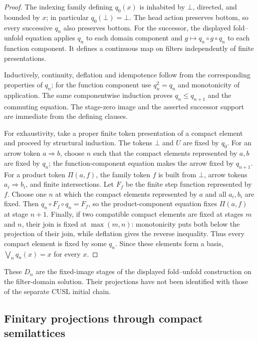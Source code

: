 \documentclass[11pt,a4paper]{article}
\theoremstyle{definition}
\theoremstyle{remark}
\begin{document}
\begin{proof}
The indexing family defining $q_0(x)$ is inhabited by $\bot$,
directed, and bounded by $x$; in particular $q_0(\bot)=\bot$.
The head action preserves bottom, so every successive $q_n$ also
preserves bottom. For the successor, the displayed
fold--unfold equation applies $q_n$ to each domain component and
$g\mapsto q_n\circ g\circ q_n$ to each function component. It defines
a continuous map on filters independently of finite presentations.

Inductively, continuity, deflation and idempotence follow from the
corresponding properties of $q_n$; for the function component use
$q_n^2=q_n$ and monotonicity of application. The same componentwise
induction proves $q_n\leq q_{n+1}$ and the commuting equation. The
stage-zero image and the asserted successor support are immediate from
the defining clauses.

For exhaustivity, take a proper finite token presentation of a compact
element and proceed by structural induction. The tokens $\bot$ and $U$
are fixed by $q_0$. For an arrow token $a\Rightarrow b$, choose $n$
such that the compact elements represented by $a,b$ are fixed by
$q_n$; the function-component equation makes the arrow fixed by
$q_{n+1}$. For a product token $\Pi(a,f)$, the family token $f$ is
built from $\bot$, arrow tokens $a_i\Rightarrow b_i$, and finite
intersections. Let $F_f$ be the finite step function represented by
$f$. Choose one $n$ at which the compact elements represented by $a$
and all $a_i,b_i$ are fixed. Then $q_n\circ F_f\circ q_n=F_f$, so
the product-component equation fixes
$\Pi(a,f)$ at stage $n+1$. Finally, if two compatible compact elements
are fixed at stages $m$ and $n$, their join is fixed at
$\max(m,n)$: monotonicity puts both below the projection of their
join, while deflation gives the reverse inequality. Thus every compact
element is fixed by some $q_n$. Since these elements form a basis,
$\bigvee_n q_n(x)=x$ for every $x$.
\end{proof}

These $D_n$ are the fixed-image stages of the displayed fold--unfold
construction on the filter-domain solution. Their projections have not
been identified with those of the separate CUSL initial chain.

\subsection{Finitary projections through compact semilattices}
\end{document}
